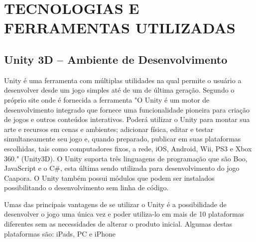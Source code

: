 \chapter{TECNOLOGIAS E FERRAMENTAS UTILIZADAS}
\label{cap:TECNOLOGIAS-E-FERRAMENTAS-UTILIZADAS}


\section{Unity 3D – Ambiente de Desenvolvimento}
\label{sec:Unity-3D-–-Ambiente-de-Desenvolvimento}

Unity é uma ferramenta com múltiplas utilidades na qual permite o usuário a desenvolver desde um jogo simples até de um de última geração.
Segundo o próprio site onde é fornecida a ferramenta "O Unity é um motor de desenvolvimento integrado que fornece uma funcionalidade pioneira para criação de jogos e outros conteúdos interativos. Poderá utilizar o Unity para montar sua arte e recursos em cenas e ambientes; adicionar física, editar e testar simultaneamente seu jogo e, quando preparado, publicar em suas plataformas escolhidas, tais como computadores fixos, a rede, iOS, Android, Wii, PS3 e Xbox 360." (Unity3D).
O Unity suporta três linguagens de programação que são Boo, JavaScript e o C#, esta última sendo utilizada para desenvolvimento do jogo Caapora. O Unity também possui módulos que podem ser instalados possibilitando o desenvolvimento sem linha de código.


	\begin{figure}[h!]
		\centering
	\end{figure}
	
Umas das principais vantagens de se utilizar o Unity é a possibilidade de desenvolver o jogo uma única vez e poder utiliza-lo em mais de 10 plataformas diferentes sem as necessidades de alterar o produto inicial. 
Algumas destas plataformas são: iPads, PC e iPhone


